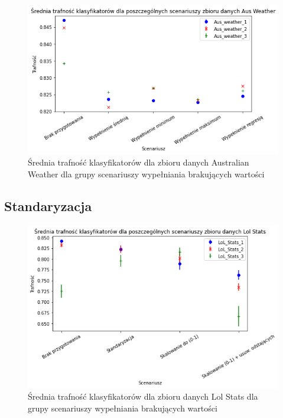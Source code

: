 \documentclass{book}
\begin{document}
\begin{figure}[H]
    \centerline{\includegraphics[scale=0.5]{Aus_Weather_Avg_Wypełnienie_brakujących}}
    \centering
    \caption{Średnia trafność klasyfikatorów dla zbioru danych Australian Weather 
    dla grupy scenariuszy wypełniania brakujących wartości}
    \end{figure}

\subsection{Standaryzacja}

\begin{figure}[H]
    \centerline{\includegraphics[scale=0.5]{Lol_Stats_Avg_Standaryzacja}}
    \centering
    \caption{Średnia trafność klasyfikatorów dla zbioru danych Lol Stats 
    dla grupy scenariuszy wypełniania brakujących wartości}
    \end{figure}
\end{document}

